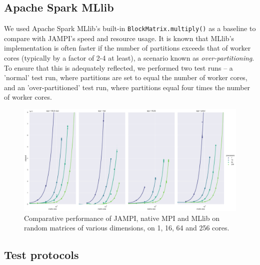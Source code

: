 \documentclass[bdcc,article,submit,moreauthors,pdftex]{Definitions/mdpi}
\begin{document}


\subsection{Apache Spark MLlib}

We used Apache Spark MLlib's built-in \texttt{BlockMatrix.multiply()} as a baseline to compare with JAMPI's speed and resource usage. It is known that MLlib's implementation is often faster if the number of partitions exceeds that of worker cores (typically by a factor of 2-4 at least), a scenario known as \emph{over-partitioning}. To ensure that this is adequately reflected, we performed two test runs – a 'normal' test run, where partitions are set to equal the number of worker cores, and an 'over-partitioned' test run, where partitions equal four times the number of worker cores.

\begin{figure}
	\centering
	\includegraphics[width=0.9\linewidth]{overall_performance}
	\vspace{14pt}
	\caption{Comparative performance of JAMPI, native MPI and MLlib on random matrices of various dimensions, on 1, 16, 64 and 256 cores.}
	\label{fig:overall_performance}
\end{figure}
\subsection{Test protocols} %
\label{sub:test_protocols}
\end{document}
